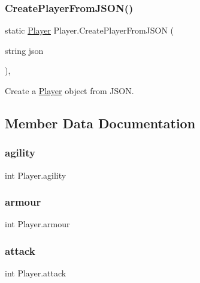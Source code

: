 \subsubsection{\texorpdfstring{CreatePlayerFromJSON()}{CreatePlayerFromJSON()}}
{\footnotesize\ttfamily static \mbox{\hyperlink{class_player}{Player}} Player.\+Create\+Player\+From\+J\+S\+ON (\begin{DoxyParamCaption}\item[{string}]{json }\end{DoxyParamCaption})\hspace{0.3cm}{\ttfamily [inline]}, {\ttfamily [static]}}



Create a \mbox{\hyperlink{class_player}{Player}} object from J\+S\+ON. 



\subsection{Member Data Documentation}
\mbox{\label{class_player_ae49bfbaba1583b695d12235263841f96}} 
\subsubsection{\texorpdfstring{agility}{agility}}
{\footnotesize\ttfamily int Player.\+agility\hspace{0.3cm}{\ttfamily [private]}}

\mbox{\label{class_player_a51ccca43f3c0a2549e95bacf1b71e504}} 
\subsubsection{\texorpdfstring{armour}{armour}}
{\footnotesize\ttfamily int Player.\+armour\hspace{0.3cm}{\ttfamily [private]}}

\mbox{\label{class_player_a9912e57826c51a067ab34db854f31562}} 
\subsubsection{\texorpdfstring{attack}{attack}}
{\footnotesize\ttfamily int Player.\+attack\hspace{0.3cm}{\ttfamily [private]}}


